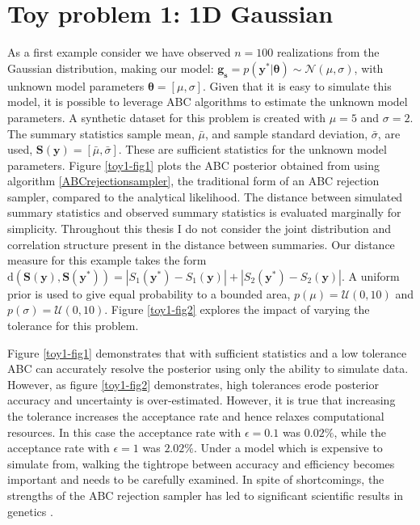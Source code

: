 \section{Toy problem 1: 1D Gaussian}
As a first example consider we have observed $n = 100$ realizations from the Gaussian distribution, making our model: $\bm{g_s} = p(\bm{y^*}|\bm{\theta}) \sim \mathcal{N}(\mu,\sigma)$, with unknown model parameters $\bm{\theta} = [\mu,\sigma]$. Given that it is easy to simulate this model, it is possible to leverage ABC algorithms to estimate the unknown model parameters. A synthetic dataset for this problem is created with $\mu = 5$ and $\sigma = 2$. The summary statistics sample mean, $\bar{\mu}$, and sample standard deviation, $\bar{\sigma}$, are used, $\bm{S}(\bm{y}) = [\bar{\mu},\bar{\sigma}]$. These are sufficient statistics for the unknown model parameters. Figure \ref{toy1-fig1} plots the ABC posterior obtained from using algorithm \ref{ABCrejectionsampler}, the traditional form of an ABC rejection sampler, compared to the analytical likelihood. The distance between simulated summary statistics and observed summary statistics is evaluated marginally for simplicity. Throughout this thesis I do not consider the joint distribution and correlation structure present in the distance between summaries. Our distance measure for this example takes the form $\text{d}(\bm{S}(\bm{y}),\bm{S}(\bm{y^*})) = |S_1(\bm{y^*}) - S_1(\bm{y})| +| S_2(\bm{y^*}) - S_2(\bm{y})|$. A uniform prior is used to give equal probability to a bounded area, $p(\mu) = \mathcal{U}(0,10)$ and $p(\sigma) = \mathcal{U}(0,10)$. Figure \ref{toy1-fig2} explores the impact of varying the tolerance for this problem.\par

Figure \ref{toy1-fig1} demonstrates that with sufficient statistics and a low tolerance ABC can accurately resolve the posterior using only the ability to simulate data. However, as figure \ref{toy1-fig2} demonstrates, high tolerances erode posterior accuracy and uncertainty is over-estimated. However, it is true that increasing the tolerance increases the acceptance rate and hence relaxes computational resources. In this case the acceptance rate with $\epsilon = 0.1$ was $0.02\%$, while the acceptance rate with $\epsilon = 1$ was $2.02\%$. Under a model which is expensive to simulate from, walking the tightrope between accuracy and efficiency becomes important and needs to be carefully examined. In spite of shortcomings, the strengths of the ABC rejection sampler has led to significant scientific results in genetics \citep{Fu1997,Weiss1998a,Pritchard1999a}.

